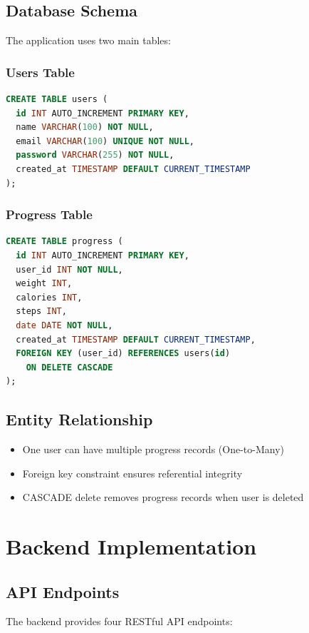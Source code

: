 \documentclass[12pt,a4paper]{article}
\begin{document}
\subsection{Database Schema}
The application uses two main tables:

\subsubsection{Users Table}
\begin{lstlisting}[language=SQL]
CREATE TABLE users (
  id INT AUTO_INCREMENT PRIMARY KEY,
  name VARCHAR(100) NOT NULL,
  email VARCHAR(100) UNIQUE NOT NULL,
  password VARCHAR(255) NOT NULL,
  created_at TIMESTAMP DEFAULT CURRENT_TIMESTAMP
);
\end{lstlisting}

\subsubsection{Progress Table}
\begin{lstlisting}[language=SQL]
CREATE TABLE progress (
  id INT AUTO_INCREMENT PRIMARY KEY,
  user_id INT NOT NULL,
  weight INT,
  calories INT,
  steps INT,
  date DATE NOT NULL,
  created_at TIMESTAMP DEFAULT CURRENT_TIMESTAMP,
  FOREIGN KEY (user_id) REFERENCES users(id) 
    ON DELETE CASCADE
);
\end{lstlisting}

\subsection{Entity Relationship}
\begin{itemize}
    \item One user can have multiple progress records (One-to-Many)
    \item Foreign key constraint ensures referential integrity
    \item CASCADE delete removes progress records when user is deleted
\end{itemize}

\section{Backend Implementation}

\subsection{API Endpoints}
The backend provides four RESTful API endpoints:
\end{document}

